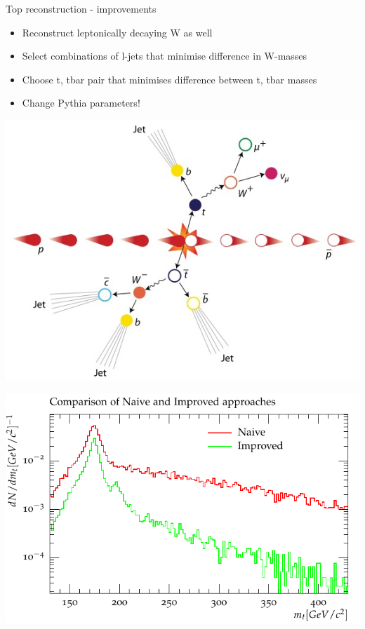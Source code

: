 \documentclass{beamer}
\begin{document}
  \begin{frame}{Top reconstruction - improvements}
    \begin{itemize}[<uncover@+>]
      \item Reconstruct leptonically decaying W as well
      \item Select combinations of l-jets that minimise difference in W-masses
      \item Choose t, tbar pair that minimises difference between t, tbar masses
      \item Change Pythia parameters!
    \end{itemize}
    \includegraphics[height=0.4\textheight]{ttbar.jpg}
  \end{frame}

  \begin{frame}
    \includegraphics[width=\textwidth]{comparison}
  \end{frame}
	
\end{document}
